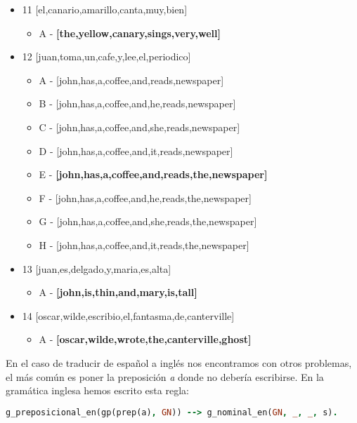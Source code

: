 \documentclass{article}
\begin{document}
\begin{itemize}
    \item 11 [el,canario,amarillo,canta,muy,bien]
    \begin{itemize}
        \item A - \textbf{[the,yellow,canary,sings,very,well]}
    \end{itemize}

    \item 12 [juan,toma,un,cafe,y,lee,el,periodico]
    \begin{itemize}
        \item A - [john,has,a,coffee,and,reads,newspaper]
        \item B - [john,has,a,coffee,and,he,reads,newspaper]
        \item C - [john,has,a,coffee,and,she,reads,newspaper]
        \item D - [john,has,a,coffee,and,it,reads,newspaper]
        \item E - \textbf{[john,has,a,coffee,and,reads,the,newspaper]}
        \item F - [john,has,a,coffee,and,he,reads,the,newspaper]
        \item G - [john,has,a,coffee,and,she,reads,the,newspaper]
        \item H - [john,has,a,coffee,and,it,reads,the,newspaper]
    \end{itemize}

    \item 13 [juan,es,delgado,y,maria,es,alta]
    \begin{itemize}
        \item A - \textbf{[john,is,thin,and,mary,is,tall]}
    \end{itemize}

    \item 14 [oscar,wilde,escribio,el,fantasma,de,canterville]
    \begin{itemize}
        \item A - \textbf{[oscar,wilde,wrote,the,canterville,ghost]}
    \end{itemize}

\end{itemize}

En el caso de traducir de español a inglés nos encontramos con otros problemas, el más común es poner la preposición \textit{a} donde
no debería escribirse. En la gramática inglesa hemos escrito esta regla:

\begin{lstlisting}[breaklines=true, language=Prolog]
    g_preposicional_en(gp(prep(a), GN)) --> g_nominal_en(GN, _, _, s).
\end{lstlisting}
\end{document}
